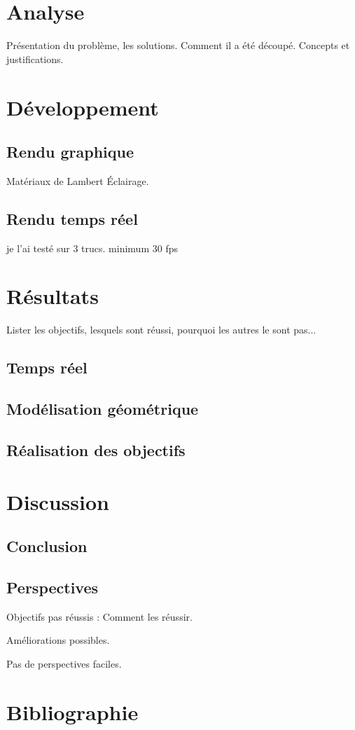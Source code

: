 \documentclass[a4paper,12pt,notitlepage]{report}
\begin{document}


\vspace*{\fill}

\vspace*{\fill}

\tableofcontents




\chapter{Analyse}
Présentation du problème, les solutions. Comment il a été découpé.
Concepts et justifications.



\chapter{Développement}

\section{Rendu graphique}
Matériaux de Lambert
Éclairage.






\section{Rendu temps réel}
je l'ai testé sur 3 trucs. minimum 30 fps

\chapter{Résultats}
Lister les objectifs, lesquels sont réussi, pourquoi les autres le sont pas...
\section{Temps réel}
\section{Modélisation géométrique}
\section{Réalisation des objectifs}

\chapter{Discussion}
\section{Conclusion}
\section{Perspectives}
Objectifs pas réussis : Comment les réussir.

Améliorations possibles.

Pas de perspectives faciles.


\chapter{Bibliographie}
\end{document}
